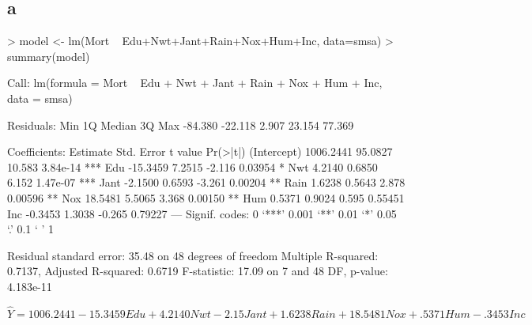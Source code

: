 \documentclass{article}
\begin{document}
\subsection*{a}
\begin{Schunk}
\begin{Sinput}
> model <- lm(Mort ~ Edu+Nwt+Jant+Rain+Nox+Hum+Inc, data=smsa)
> summary(model)
\end{Sinput}
\begin{Soutput}
Call:
lm(formula = Mort ~ Edu + Nwt + Jant + Rain + Nox + Hum + Inc, 
    data = smsa)

Residuals:
    Min      1Q  Median      3Q     Max 
-84.380 -22.118   2.907  23.154  77.369 

Coefficients:
             Estimate Std. Error t value Pr(>|t|)    
(Intercept) 1006.2441    95.0827  10.583 3.84e-14 ***
Edu          -15.3459     7.2515  -2.116  0.03954 *  
Nwt            4.2140     0.6850   6.152 1.47e-07 ***
Jant          -2.1500     0.6593  -3.261  0.00204 ** 
Rain           1.6238     0.5643   2.878  0.00596 ** 
Nox           18.5481     5.5065   3.368  0.00150 ** 
Hum            0.5371     0.9024   0.595  0.55451    
Inc           -0.3453     1.3038  -0.265  0.79227    
---
Signif. codes:  0 ‘***’ 0.001 ‘**’ 0.01 ‘*’ 0.05 ‘.’ 0.1 ‘ ’ 1

Residual standard error: 35.48 on 48 degrees of freedom
Multiple R-squared:  0.7137,	Adjusted R-squared:  0.6719 
F-statistic: 17.09 on 7 and 48 DF,  p-value: 4.183e-11
\end{Soutput}
\end{Schunk}
$\hat{Y} = 1006.2441-15.3459Edu+4.2140Nwt-2.15Jant+1.6238Rain+18.5481Nox+.5371Hum-.3453Inc$
\end{document}
